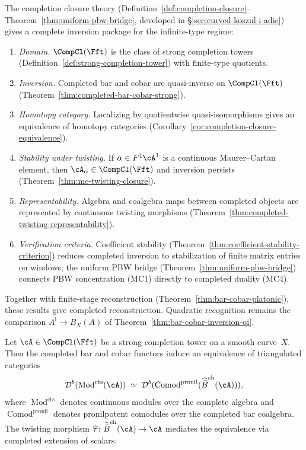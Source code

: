 \begin{remark}
\label{rem:completed-inversion-summary}
The completion closure theory
(Definition~\ref{def:completion-closure}--Theorem~\ref{thm:uniform-pbw-bridge},
developed in \S\ref{sec:curved-koszul-i-adic}) gives a complete
inversion package for the infinite-type regime:
\begin{enumerate}
\item \emph{Domain.}
 $\CompCl(\Fft)$ is the class of strong completion towers
 (Definition~\ref{def:strong-completion-tower}) with finite-type
 quotients.
\item \emph{Inversion.}
 Completed bar and cobar are quasi-inverse on $\CompCl(\Fft)$
 (Theorem~\ref{thm:completed-bar-cobar-strong}).
\item \emph{Homotopy category.}
 Localizing by quotientwise quasi-isomorphisms gives an equivalence
 of homotopy categories
 (Corollary~\ref{cor:completion-closure-equivalence}).
\item \emph{Stability under twisting.}
 If $\alpha \in F^1\cA^1$ is a continuous Maurer--Cartan element,
 then $\cA_\alpha \in \CompCl(\Fft)$ and inversion persists
 (Theorem~\ref{thm:mc-twisting-closure}).
\item \emph{Representability.}
 Algebra and coalgebra maps between completed objects are represented
 by continuous twisting morphisms
 (Theorem~\ref{thm:completed-twisting-representability}).
\item \emph{Verification criteria.}
 Coefficient stability
 (Theorem~\ref{thm:coefficient-stability-criterion}) reduces
 completed inversion to stabilization of finite matrix entries on
 windows; the uniform PBW bridge
 (Theorem~\ref{thm:uniform-pbw-bridge}) connects PBW concentration
 (MC1) directly to completed duality (MC4).
\end{enumerate}
Together with finite-stage reconstruction
(Theorem~\ref{thm:bar-cobar-platonic}), these results give completed
reconstruction.  Quadratic recognition remains the
comparison \(A^{\mathrm i}\to B_X(A)\) of
Theorem~\ref{thm:bar-cobar-inversion-qi}.
\end{remark}

\begin{corollary}
\label{cor:completed-derived-equivalence}
Let $\cA \in \CompCl(\Fft)$ be a strong completion tower on a
smooth curve~$X$. Then the completed bar and cobar functors induce
an equivalence of triangulated categories
\[
\mathcal{D}^b(\operatorname{Mod}^{\mathrm{cts}}(\cA))
\;\simeq\;
\mathcal{D}^b(\operatorname{Comod}^{\mathrm{pronil}}
(\widehat{\bar B}^{\mathrm{ch}}(\cA))),
\]
where $\operatorname{Mod}^{\mathrm{cts}}$ denotes continuous modules
over the complete algebra and
$\operatorname{Comod}^{\mathrm{pronil}}$ denotes pronilpotent
comodules over the completed bar coalgebra. The twisting morphism
$\widehat\tau\colon \widehat{\bar B}^{\mathrm{ch}}(\cA) \to \cA$
mediates the equivalence via completed extension of scalars.
\end{corollary}

